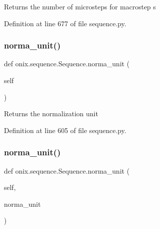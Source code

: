 \begin{DoxyVerb}Returns the number of microsteps for macrostep s\end{DoxyVerb}
 

Definition at line 677 of file sequence.\+py.

\mbox{\label{classonix_1_1sequence_1_1Sequence_a180c5c6bfafa1bceabce0c8365fb36f0}} 
\subsubsection{\texorpdfstring{norma\+\_\+unit()}{norma\_unit()}\hspace{0.1cm}{\footnotesize\ttfamily [1/2]}}
{\footnotesize\ttfamily def onix.\+sequence.\+Sequence.\+norma\+\_\+unit (\begin{DoxyParamCaption}\item[{}]{self }\end{DoxyParamCaption})}

\begin{DoxyVerb}Returns the normalization unit\end{DoxyVerb}
 

Definition at line 605 of file sequence.\+py.

\mbox{\label{classonix_1_1sequence_1_1Sequence_ab1965b8fda8d2c9fbc69fd075825380f}} 
\subsubsection{\texorpdfstring{norma\+\_\+unit()}{norma\_unit()}\hspace{0.1cm}{\footnotesize\ttfamily [2/2]}}
{\footnotesize\ttfamily def onix.\+sequence.\+Sequence.\+norma\+\_\+unit (\begin{DoxyParamCaption}\item[{}]{self,  }\item[{}]{norma\+\_\+unit }\end{DoxyParamCaption})}

